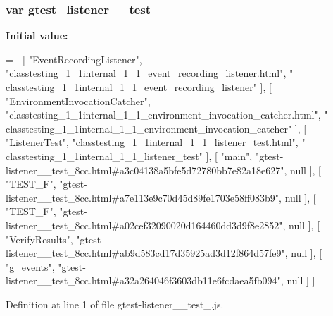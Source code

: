 \subsubsection[{\texorpdfstring{gtest\+\_\+listener\+\_\+\+\_\+test\+\_\+8cc}{gtest_listener__test_8cc}}]{\setlength{\rightskip}{0pt plus 5cm}var gtest\+\_\+listener\+\_\+\+\_\+test\+\_}\hypertarget{gtest-listener____test__8cc_8js_a6a61d03e306486862d0fd1baebbb0bf9}{}\label{gtest-listener____test__8cc_8js_a6a61d03e306486862d0fd1baebbb0bf9}
{\bfseries Initial value\+:}
\begin{DoxyCode}
=
[
    [ \textcolor{stringliteral}{"EventRecordingListener"}, \textcolor{stringliteral}{"classtesting\_1\_1internal\_1\_1\_event\_recording\_listener.html"}, \textcolor{stringliteral}{"
      classtesting\_1\_1internal\_1\_1\_event\_recording\_listener"} ],
    [ \textcolor{stringliteral}{"EnvironmentInvocationCatcher"}, \textcolor{stringliteral}{"classtesting\_1\_1internal\_1\_1\_environment\_invocation\_catcher.html"}, \textcolor{stringliteral}{"
      classtesting\_1\_1internal\_1\_1\_environment\_invocation\_catcher"} ],
    [ \textcolor{stringliteral}{"ListenerTest"}, \textcolor{stringliteral}{"classtesting\_1\_1internal\_1\_1\_listener\_test.html"}, \textcolor{stringliteral}{"
      classtesting\_1\_1internal\_1\_1\_listener\_test"} ],
    [ \textcolor{stringliteral}{"main"}, \textcolor{stringliteral}{"gtest-listener\_\_test\_8cc.html#a3c04138a5bfe5d72780bb7e82a18e627"}, null ],
    [ \textcolor{stringliteral}{"TEST\_F"}, \textcolor{stringliteral}{"gtest-listener\_\_test\_8cc.html#a7e113e9c70d45d89fe1703e58ff083b9"}, null ],
    [ \textcolor{stringliteral}{"TEST\_F"}, \textcolor{stringliteral}{"gtest-listener\_\_test\_8cc.html#a02cef32090020d164460dd3d9f8e2852"}, null ],
    [ \textcolor{stringliteral}{"VerifyResults"}, \textcolor{stringliteral}{"gtest-listener\_\_test\_8cc.html#ab9d583cd17d35925ad3d12f864d57fe9"}, null ],
    [ \textcolor{stringliteral}{"g\_events"}, \textcolor{stringliteral}{"gtest-listener\_\_test\_8cc.html#a32a264046f3603db11e6fcdaea5fb094"}, null ]
]
\end{DoxyCode}


Definition at line 1 of file gtest-\/listener\+\_\+\+\_\+test\+\_.\+js.


